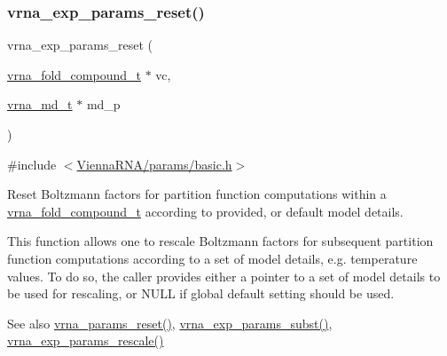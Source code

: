 \subsubsection{\texorpdfstring{vrna\_exp\_params\_reset()}{vrna\_exp\_params\_reset()}}
{\footnotesize\ttfamily vrna\+\_\+exp\+\_\+params\+\_\+reset (\begin{DoxyParamCaption}\item[{\mbox{\hyperlink{group__fold__compound_ga1b0cef17fd40466cef5968eaeeff6166}{vrna\+\_\+fold\+\_\+compound\+\_\+t}} $\ast$}]{vc,  }\item[{\mbox{\hyperlink{group__model__details_ga1f8a10e12a0a1915f2a4eff0b28ea17c}{vrna\+\_\+md\+\_\+t}} $\ast$}]{md\+\_\+p }\end{DoxyParamCaption})}



{\ttfamily \#include $<$\mbox{\hyperlink{params_2basic_8h}{Vienna\+R\+N\+A/params/basic.\+h}}$>$}



Reset Boltzmann factors for partition function computations within a \mbox{\hyperlink{group__fold__compound_ga1b0cef17fd40466cef5968eaeeff6166}{vrna\+\_\+fold\+\_\+compound\+\_\+t}} according to provided, or default model details. 

This function allows one to rescale Boltzmann factors for subsequent partition function computations according to a set of model details, e.\+g. temperature values. To do so, the caller provides either a pointer to a set of model details to be used for rescaling, or N\+U\+LL if global default setting should be used.

\begin{DoxySeeAlso}{See also}
\mbox{\hyperlink{group__energy__parameters_gac40dc82e48a72a97cfc58b9da08a7792}{vrna\+\_\+params\+\_\+reset()}}, \mbox{\hyperlink{group__energy__parameters_ga8e7ac4fab3b0cc03afbc134eaafb3525}{vrna\+\_\+exp\+\_\+params\+\_\+subst()}}, \mbox{\hyperlink{group__energy__parameters_gad607bc3a5b5da16400e2ca4ea5560233}{vrna\+\_\+exp\+\_\+params\+\_\+rescale()}} 
\end{DoxySeeAlso}

